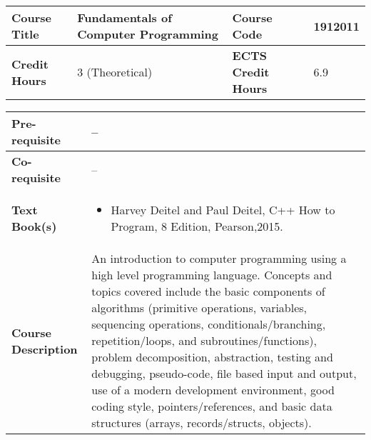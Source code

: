 \documentclass[12pt]{article}
\begin{document}
\begin{minipage}{\textwidth}
\begin{tabularx}{\textwidth}{|l|X|l|X|}
\hline
\textbf{Course Title}       &   Fundamentals of Computer Programming & \textbf{Course Code}       &  1912011 \\ \hline
\textbf{Credit Hours}       &  3  (Theoretical) & \textbf{ECTS Credit Hours}       &  6.9 \\ \hline
\end{tabularx}

\begin{tabularx}{\textwidth}{|l|X|}
\hline
\textbf{Pre-requisite}      &  -- \\ \hline
\textbf{Co-requisite}       &  -- \\ \hline
\textbf{Text Book(s)}      & \begin{minipage}{.70\textwidth}
					\begin{itemize} \itemsep-0.4em
						\vspace{3mm}
						\item Harvey Deitel and Paul Deitel, C++ How to Program, 8 Edition, Pearson,2015.
						\vspace{3mm}
					\end{itemize}
				\end{minipage}  \\ \hline
\textbf{Course Description} & \begin{minipage}{.70\textwidth}
					\vspace{3mm}
					An introduction to computer programming using a high level programming language. Concepts and topics
					covered include the basic components of algorithms (primitive operations, variables, sequencing operations,
					conditionals/branching, repetition/loops, and subroutines/functions), problem decomposition, abstraction, testing
					and debugging, pseudo-code, file based input and output, use of a modern development environment, good
					coding style, pointers/references, and basic data structures (arrays, records/structs, objects).					

					\vspace{3mm}
					\end{minipage} \\ \hline
\end{tabularx}
\end{minipage}


\bigskip
\bigskip
\end{document}
